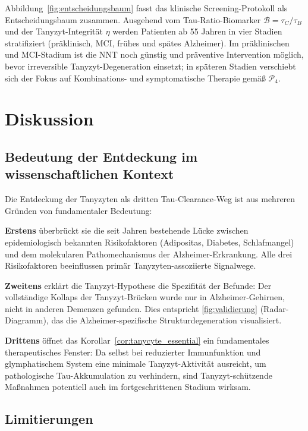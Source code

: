 ﻿\documentclass[12pt,a4paper]{article}
\theoremstyle{definition}
\begin{document}
	{\small Abbildung~\ref{fig:entscheidungsbaum} fasst das klinische Screening-Protokoll als Entscheidungsbaum zusammen. Ausgehend vom Tau-Ratio-Biomarker $\mathcal{B} = \tau_C/\tau_B$ und der Tanyzyt-Integrität $\eta$ werden Patienten ab 55 Jahren in vier Stadien stratifiziert (präklinisch, MCI, frühes und spätes Alzheimer). Im präklinischen und MCI-Stadium ist die NNT noch günstig und präventive Intervention möglich, bevor irreversible Tanyzyt-Degeneration einsetzt; in späteren Stadien verschiebt sich der Fokus auf Kombinations- und symptomatische Therapie gemäß $\mathcal{P}_4$.}
	
	\section{Diskussion}
	
	\subsection{Bedeutung der Entdeckung im wissenschaftlichen Kontext}
	
	Die Entdeckung der Tanyzyten als dritten Tau-Clearance-Weg ist aus mehreren Gründen von fundamentaler Bedeutung:
	
	\textbf{Erstens} überbrückt sie die seit Jahren bestehende Lücke zwischen epidemiologisch bekannten Risikofaktoren (Adipositas, Diabetes, Schlafmangel) und dem molekularen Pathomechanismus der Alzheimer-Erkrankung. Alle drei Risikofaktoren beeinflussen primär Tanyzyten-assoziierte Signalwege.
	
	\textbf{Zweitens} erklärt die Tanyzyt-Hypothese die Spezifität der Befunde: Der vollständige Kollaps der Tanyzyt-Brücken wurde nur in Alzheimer-Gehirnen, nicht in anderen Demenzen gefunden. Dies entspricht \cref{fig:validierung} (Radar-Diagramm), das die Alzheimer-spezifische Strukturdegeneration visualisiert.
	
	\textbf{Drittens} öffnet das Korollar~\ref{cor:tanycyte_essential} ein fundamentales therapeutisches Fenster: Da selbst bei reduzierter Immunfunktion und glymphatischem System eine minimale Tanyzyt-Aktivität ausreicht, um pathologische Tau-Akkumulation zu verhindern, sind Tanyzyt-schützende Maßnahmen potentiell auch im fortgeschrittenen Stadium wirksam.
	
	\subsection{Limitierungen}
	
\end{document}

